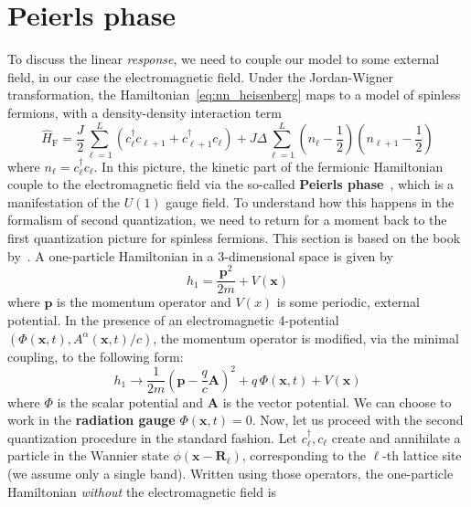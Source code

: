 \section{Peierls phase}
To discuss the linear \textit{response}, we need to couple our model to some external field, in our
case the electromagnetic field. Under the Jordan-Wigner transformation, the Hamiltonian~\eqref{eq:nn_heisenberg}
maps to a model of spinless fermions, with a density-density interaction term
\begin{equation}
    \hat{H} _{\text{F} } = \frac{J}{2}\sum_{\ell=1}^{L} \left( c_{\ell}^{\dagger} c_{\ell+1} + c_{\ell+1}^{\dagger} c_{\ell} \right)
    + J \Delta \sum_{\ell=1}^{L} \left(n_{\ell} - \frac{1}{2}\right)\left(n_{\ell+1}-\frac{1}{2}\right)
\end{equation}
where \(n_{\ell} = c^{\dag}_{\ell}c_{\ell}\).
In this picture, the kinetic part of the fermionic Hamiltonian couple to the electromagnetic field
via the so-called \textbf{Peierls phase}~\autocite{Peierls1933, Luttinger1951, Kohn1959, Blount1962, Wannier1962}, which is a manifestation of the \(U(1)\) gauge field. To understand
how this happens in the formalism of second quantization, we need to return for a moment back to the
first quantization picture for spinless fermions. This section is based on the book by~\textcite{Essler2005}.
A one-particle Hamiltonian in a 3-dimensional space is given by
\begin{equation}
    h_{1} = \frac{\mathbf{p}^{2}}{2m} + V(\mathbf{x} )
\end{equation}
where \(\mathbf{p}\) is the momentum operator and \(V(x)\) is some periodic, external potential. In the presence of an
electromagnetic 4-potential \(\left(\Phi(\mathbf{x},t ), A^{\alpha }(\mathbf{x} ,t)/c\right)\),
the momentum operator is modified, via the minimal coupling, to the following form:
\begin{equation}
    h_{1} \to \frac{1}{2m}\left(\mathbf{p} - \frac{q}{c}\mathbf{A}\right)^{2} + q\,\Phi(\mathbf{x},t) + V(\mathbf{x} )
\end{equation}
where \(\Phi \) is the scalar potential and \(\mathbf{A}\) is the vector potential.
We can choose to work in the \textbf{radiation gauge} \(\Phi(\mathbf{x} ,t) = 0\).
Now, let us proceed with the second quantization procedure in the standard fashion. Let
\(c^{\dag}_{\ell},c_{\ell}\) create and annihilate a particle in the Wannier state \(\phi(\mathbf{x - \mathbf{R}_{\ell}})\),
corresponding to the \(\ell\)-th lattice site (we assume only a single band).
Written using those operators, the one-particle Hamiltonian \textit{without} the electromagnetic field is

